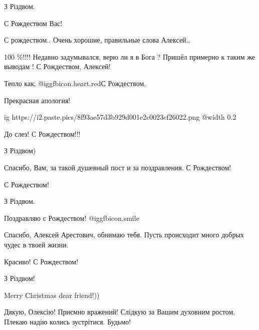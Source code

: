  
 
 
 
 
\zzSecCmt

\begin{multicols}{2} %
\setlength{\parindent}{0pt}

З Різдвом.

С Рождеством Вас!

С рождеством.. Очень хорошие, правильные слова Алексей..

100 \%!!!! Недавно задумывался, верю ли я в Бога ? Пришёл примерно к таким же выводам ! С Рождеством, Алексей!

Тепло как. @igg{fbicon.heart.red}С Рождеством.

Прекрасная апология!


\ifcmt
  ig https://i2.paste.pics/8f93ae57d3b929d001e2c0023cf26022.png
  @width 0.2
\fi

До слез!
С Рождеством!!!

З Різдвом)

Спасибо, Вам, за такой душевный пост и за поздравления. С Рождеством!

С Рождеством!

З Різдвом.

Поздравляю с Рождеством!  @igg{fbicon.smile} 

Спасибо, Алексей Арестович, обнимаю тебя. Пусть происходит много добрых чудес в твоей жизни.

Красиво!
С Рождеством!

З Різдвом!

Merry Christmas dear friend!))

Дякую, Олексію! Приємно вражений! Слідкую за Вашим духовним ростом. Плекаю надію колись зустрітися. Будьмо!


\end{multicols}
